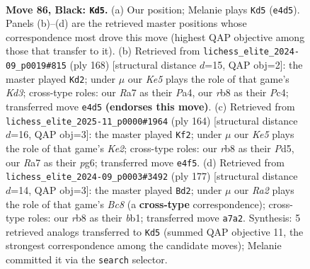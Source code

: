 \documentclass[11pt]{article}
\begin{document}
\clearpage

\begin{figure}[p]\centering
\begin{subfigure}{0.46\textwidth}\centering
\resizebox{\linewidth}{!}{%
\newchessgame
\chessboard[
  setfen={1R6/r5p1/3P1p2/7p/4k2P/6P1/2N5/7K b - - 0 86},
  showmover=false,
  pgfstyle=straightmove, color=movearrow, markmove={e4-d5}
]}
\caption{}
\end{subfigure}\hfill
\begin{subfigure}{0.46\textwidth}\centering
\resizebox{\linewidth}{!}{%
\newchessgame
\chessboard[
  setfen={5k2/8/3p4/p4Pp1/P1P2pP1/3K4/8/8 w - - 17 85},
  showmover=false,
  pgfstyle=straightmove, color=movearrow, markmove={d3-d2}
]}
\caption{}
\end{subfigure}
\\[4pt]
\begin{subfigure}{0.46\textwidth}\centering
\resizebox{\linewidth}{!}{%
\newchessgame
\chessboard[
  setfen={3k4/8/6p1/2pPp1P1/2P2p2/3P4/4K3/8 w - - 45 83},
  showmover=false,
  pgfstyle=straightmove, color=movearrow, markmove={e2-f2}
]}
\caption{}
\end{subfigure}\hfill
\begin{subfigure}{0.46\textwidth}\centering
\resizebox{\linewidth}{!}{%
\newchessgame
\chessboard[
  setfen={8/4k3/8/p2K2p1/P5Pp/7P/8/1Bb5 b - - 42 89},
  showmover=false,
  pgfstyle=straightmove, color=movearrow, markmove={c1-d2}
]}
\caption{}
\end{subfigure}
\caption{\textbf{Move 86, Black: \texttt{Kd5}.} (a) Our position; Melanie plays \texttt{Kd5} (\texttt{e4d5}). Panels (b)--(d) are the retrieved master positions whose correspondence most drove this move (highest QAP objective among those that transfer to it). (b) Retrieved from \texttt{lichess\_elite\_2024-09\_p0019\#815} (ply 168) [structural distance $d$=15, QAP obj=2]: the master played \texttt{Kd2}; under $\mu$ our \emph{Ke5} plays the role of that game's \emph{Kd3}; cross-type roles: our \emph{R}a7 as their \emph{P}a4, our \emph{r}b8 as their \emph{P}c4; transferred move \texttt{e4d5} \textbf{(endorses this move)}. (c) Retrieved from \texttt{lichess\_elite\_2025-11\_p0000\#1964} (ply 164) [structural distance $d$=16, QAP obj=3]: the master played \texttt{Kf2}; under $\mu$ our \emph{Ke5} plays the role of that game's \emph{Ke2}; cross-type roles: our \emph{r}b8 as their \emph{P}d5, our \emph{R}a7 as their \emph{p}g6; transferred move \texttt{e4f5}. (d) Retrieved from \texttt{lichess\_elite\_2024-09\_p0003\#3492} (ply 177) [structural distance $d$=14, QAP obj=3]: the master played \texttt{Bd2}; under $\mu$ our \emph{Ra2} plays the role of that game's \emph{Bc8} (a \textbf{cross-type} correspondence); cross-type roles: our \emph{r}b8 as their \emph{b}b1; transferred move \texttt{a7a2}. Synthesis: 5 retrieved analogs transferred to \texttt{Kd5} (summed QAP objective 11, the strongest correspondence among the candidate moves); Melanie committed it via the \texttt{search} selector.}
\label{fig:thought-m171}
\end{figure}
\end{document}
